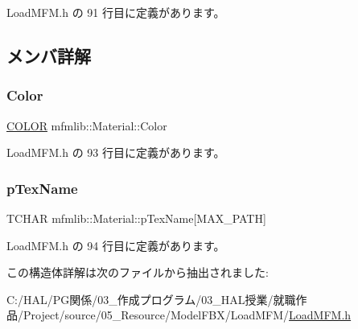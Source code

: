  Load\+M\+F\+M.\+h の 91 行目に定義があります。



\subsection{メンバ詳解}
\mbox{\label{structmfmlib_1_1_material_a620cca0ff3e33693e771d703704a6086}} 
\subsubsection{\texorpdfstring{Color}{Color}}
{\footnotesize\ttfamily \mbox{\hyperlink{structmfmlib_1_1_c_o_l_o_r}{C\+O\+L\+OR}} mfmlib\+::\+Material\+::\+Color}



 Load\+M\+F\+M.\+h の 93 行目に定義があります。

\mbox{\label{structmfmlib_1_1_material_a10b07a0cae5af3ec9f47d5da4a8d35e2}} 
\subsubsection{\texorpdfstring{p\+Tex\+Name}{pTexName}}
{\footnotesize\ttfamily T\+C\+H\+AR mfmlib\+::\+Material\+::p\+Tex\+Name\mbox{[}M\+A\+X\+\_\+\+P\+A\+TH\mbox{]}}



 Load\+M\+F\+M.\+h の 94 行目に定義があります。



この構造体詳解は次のファイルから抽出されました\+:\begin{DoxyCompactItemize}
\item 
C\+:/\+H\+A\+L/\+P\+G関係/03\+\_\+作成プログラム/03\+\_\+\+H\+A\+L授業/就職作品/\+Project/source/05\+\_\+\+Resource/\+Model\+F\+B\+X/\+Load\+M\+F\+M/\mbox{\hyperlink{_load_m_f_m_8h}{Load\+M\+F\+M.\+h}}\end{DoxyCompactItemize}
